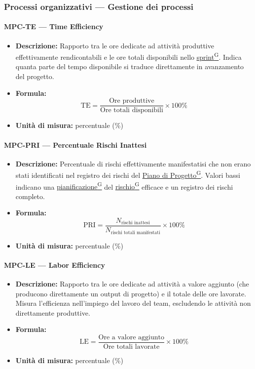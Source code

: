 \documentclass[a4paper,12pt]{article}
\providecommand{\glslink}[2]{\href{https://alittlebyte-19.github.io/Documentazione/glossario.html\#gls-#1}{\underline{#2}\textsuperscript{\scriptsize G}}}
\begin{document}
\subsubsection{Processi organizzativi --- Gestione dei processi}

\paragraph{MPC-TE --- Time Efficiency}
\begin{itemize}
    \item \textbf{Descrizione:} Rapporto tra le ore dedicate ad attività produttive effettivamente rendicontabili e le ore totali disponibili nello \glslink{sprint}{sprint}. Indica quanta parte del tempo disponibile si traduce direttamente in avanzamento del progetto.
    \item \textbf{Formula:}
    $$\text{TE} = \frac{\text{Ore produttive}}{\text{Ore totali disponibili}} \times 100\%$$
    \item \textbf{Unità di misura:} percentuale (\%)
\end{itemize}

\paragraph{MPC-PRI --- Percentuale Rischi Inattesi}
\begin{itemize}
    \item \textbf{Descrizione:} Percentuale di rischi effettivamente manifestatisi che non erano stati identificati nel registro dei rischi del \glslink{piano-di-progetto}{Piano di Progetto}. Valori bassi indicano una \glslink{pianificazione}{pianificazione} del \glslink{rischio}{rischio} efficace e un registro dei rischi completo.
    \item \textbf{Formula:}
    $$\text{PRI} = \frac{N_{\text{rischi inattesi}}}{N_{\text{rischi totali manifestati}}} \times 100\%$$
    \item \textbf{Unità di misura:} percentuale (\%)
\end{itemize}

\paragraph{MPC-LE --- Labor Efficiency}
\begin{itemize}
    \item \textbf{Descrizione:} Rapporto tra le ore dedicate ad attività a valore aggiunto (che producono direttamente un output di progetto) e il totale delle ore lavorate. Misura l'efficienza nell'impiego del lavoro del team, escludendo le attività non direttamente produttive.
    \item \textbf{Formula:}
    $$\text{LE} = \frac{\text{Ore a valore aggiunto}}{\text{Ore totali lavorate}} \times 100\%$$
    \item \textbf{Unità di misura:} percentuale (\%)
\end{itemize}
\end{document}
